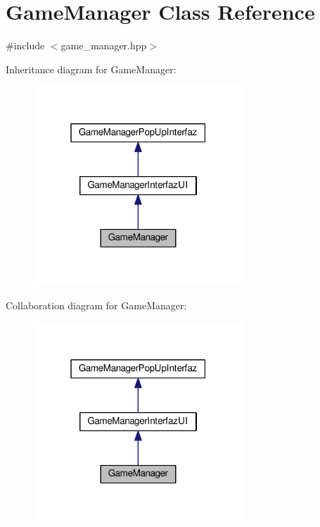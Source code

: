 \hypertarget{class_game_manager}{}\section{Game\+Manager Class Reference}
\label{class_game_manager}


{\ttfamily \#include $<$game\+\_\+manager.\+hpp$>$}



Inheritance diagram for Game\+Manager\+:\nopagebreak
\begin{figure}[H]
\begin{center}
\leavevmode
\includegraphics[width=223pt]{class_game_manager__inherit__graph}
\end{center}
\end{figure}


Collaboration diagram for Game\+Manager\+:\nopagebreak
\begin{figure}[H]
\begin{center}
\leavevmode
\includegraphics[width=223pt]{class_game_manager__coll__graph}
\end{center}
\end{figure}
